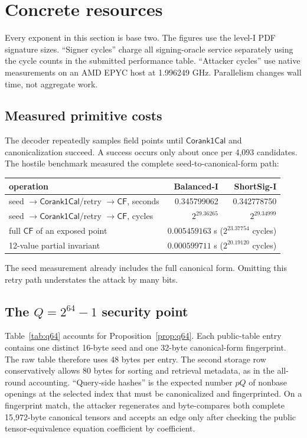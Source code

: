 \documentclass[11pt,a4paper]{article}
\newcommand{\CF}{\mathsf{CF}}
\newcommand{\Corank}{\mathsf{Corank1Cal}}
\begin{document}
\section{Concrete resources}

Every exponent in this section is base two.  The figures use the level-I PDF
signature sizes.  ``Signer cycles'' charge all signing-oracle service
separately using the cycle counts in the submitted performance table.
``Attacker cycles'' use native measurements on an AMD EPYC host at 1.996249
GHz.  Parallelism changes wall time, not aggregate work.

\subsection{Measured primitive costs}

The decoder repeatedly samples field points until $\Corank$ and canonicalization
succeed.  A success occurs only about once per 4,093 candidates.  The hostile
benchmark measured the complete seed-to-canonical-form path:
\begin{center}
\small
\begin{tabular}{lrr}
\toprule
operation & Balanced-I & ShortSig-I\\
\midrule
seed $\rightarrow\Corank$/retry $\rightarrow\CF$, seconds &
  0.345799062 & 0.342778750\\
seed $\rightarrow\Corank$/retry $\rightarrow\CF$, cycles &
  $2^{29.36265}$ & $2^{29.34999}$\\
full $\CF$ of an exposed point & \multicolumn{2}{c}{$0.005459163$ s
  ($2^{23.37754}$ cycles)}\\
12-value partial invariant & \multicolumn{2}{c}{$0.000599711$ s
  ($2^{20.19120}$ cycles)}\\
\bottomrule
\end{tabular}
\end{center}
The seed measurement already includes the full canonical form.  Omitting this
retry path understates the attack by many bits.

\subsection{The \texorpdfstring{$Q=2^{64}-1$}{Q below 2 to the 64} security point}

Table~\ref{tab:q64} accounts for Proposition~\ref{prop:q64}.  Each public-table
entry contains one distinct 16-byte seed and one 32-byte canonical-form
fingerprint.  The raw table therefore uses 48 bytes per entry.  The second
storage row conservatively allows 80 bytes for sorting and retrieval metadata,
as in the all-round accounting.  ``Query-side hashes'' is the expected number
$pQ$ of nonbase openings at the selected index that must be canonicalized and
fingerprinted.  On a fingerprint match, the attacker regenerates and
byte-compares both complete 15,972-byte canonical tensors and accepts an edge
only after checking the public tensor-equivalence equation coefficient by
coefficient.
\end{document}
